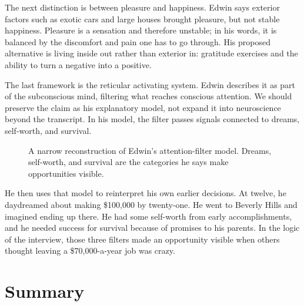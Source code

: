 The next distinction is between pleasure and happiness. Edwin says exterior factors such as exotic cars and large houses brought pleasure, but not stable happiness. Pleasure is a sensation and therefore unstable; in his words, it is balanced by the discomfort and pain one has to go through. His proposed alternative is living inside out rather than exterior in: gratitude exercises and the ability to turn a negative into a positive.

The last framework is the reticular activating system. Edwin describes it as part of the subconscious mind, filtering what reaches conscious attention. We should preserve the claim as his explanatory model, not expand it into neuroscience beyond the transcript. In his model, the filter passes signals connected to dreams, self-worth, and survival.

\begin{figure}
\centering
{}
\caption{A narrow reconstruction of Edwin's attention-filter model. Dreams, self-worth, and survival are the categories he says make opportunities visible.}
\end{figure}

He then uses that model to reinterpret his own earlier decisions. At twelve, he daydreamed about making \$100,000 by twenty-one. He went to Beverly Hills and imagined ending up there. He had some self-worth from early accomplishments, and he needed success for survival because of promises to his parents. In the logic of the interview, those three filters made an opportunity visible when others thought leaving a \$70,000-a-year job was crazy.

\section{Summary}

